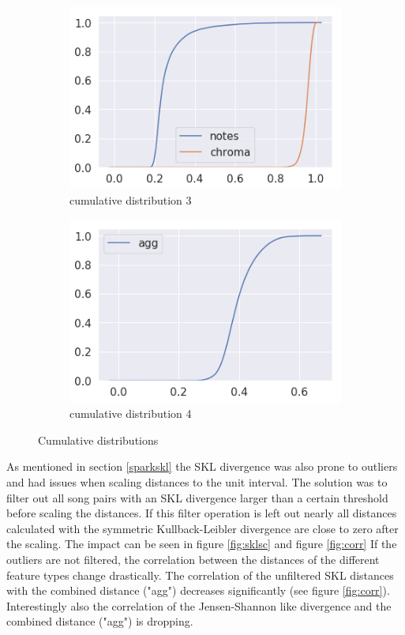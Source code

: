 \begin{figure}[htbp]
{{			\begin{subfigure}{.495\textwidth}
				\centering     
				\includegraphics[scale=0.5]{Images/SparkFeat/cum3.png}
				\caption{cumulative distribution 3}
				\label{cum3}
			\end{subfigure}%
			\begin{subfigure}{.495\textwidth}
				\centering    
				\includegraphics[scale=0.5]{Images/SparkFeat/cum4.png}
				\caption{cumulative distribution 4}
				\label{cum4}
			\end{subfigure}	
	}}
	\caption{Cumulative distributions}
	\label{fig:cumdist}
\end{figure}
\FloatBarrier

\noindent As mentioned in section \ref{sparkskl} the SKL divergence was also prone to outliers and had issues when scaling distances to the unit interval. The solution was to filter out all song pairs with an SKL divergence larger than a certain threshold before scaling the distances. If this filter operation is left out nearly all distances calculated with the symmetric Kullback-Leibler divergence are close to zero after the scaling. The impact can be seen in figure \ref{fig:sklsc} and figure \ref{fig:corr}
\noindent If the outliers are not filtered, the correlation between the distances of the different feature types change drastically. The correlation of the unfiltered SKL distances with the combined distance ("agg") decreases significantly (see figure \ref{fig:corr}). Interestingly also the correlation of the Jensen-Shannon like divergence and the combined distance ("agg") is dropping. 

